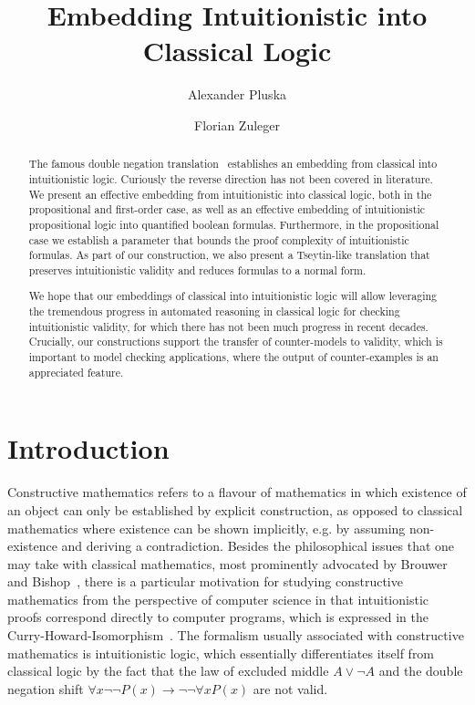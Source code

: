 \documentclass[a4paper,UKenglish,cleveref, autoref, thm-restate]{lipics-v2021}
\title{Embedding Intuitionistic into Classical Logic} %
\author{Alexander {Pluska}}{Faculty of Mathematics, Universtät Wien, Austria}{e11941874@student.tuwien.ac.at}{https://orcid.org/my-orcid?orcid=0000-0002-7709-3335}{}%
\author{Florian Zuleger}{Institute of Logic and Computation, Technische Universität Wien, Austria}{florian.zuleger@tuwien.ac.at}{https://orcid.org/0000-0003-1468-8398}{}
\begin{document}
\maketitle

\begin{abstract}
The famous double negation translation~\cite{glivenko1929quelques, godel1933intuitionistischen} establishes an embedding from classical into intuitionistic logic. Curiously the reverse direction has not been covered in literature. We present an effective embedding from intuitionistic into classical logic, both in the propositional and first-order case, as well as an effective embedding of intuitionistic propositional logic into quantified boolean formulas.
Furthermore, in the propositional case we establish a parameter that bounds the proof complexity of intuitionistic formulas. As part of our construction, we also present a Tseytin-like translation that preserves intuitionistic validity and reduces formulas to a normal form. 



We hope that our embeddings of classical into intuitionistic logic will allow leveraging the tremendous progress in automated reasoning in classical logic for checking intuitionistic validity, for which there has not been much progress in recent decades. Crucially, our constructions support the transfer of counter-models to validity, which is important to model checking applications, where the output of counter-examples is an appreciated feature.
\end{abstract}

\section{Introduction}

Constructive mathematics refers to a flavour of mathematics in which existence of an object can only be established by explicit construction, as opposed to classical mathematics where existence can be shown implicitly, e.g. by assuming non-existence and deriving a contradiction. Besides the philosophical issues that one may take with classical mathematics, most prominently advocated by Brouwer~\cite{brouwer1907over} and Bishop~\cite{bishop1967foundations}, there is a particular motivation for studying constructive mathematics from the perspective of computer science in that intuitionistic proofs correspond directly to computer programs, which is expressed in the Curry-Howard-Isomorphism~\cite{howard1980formulae}. The formalism usually associated with constructive mathematics is intuitionistic logic, which essentially differentiates itself from classical logic by the fact that the law of excluded middle $A\vee\neg A$ and the double negation shift $\forall x\neg\neg P(x)\to\neg\neg\forall xP(x)$ are not valid.
\end{document}

